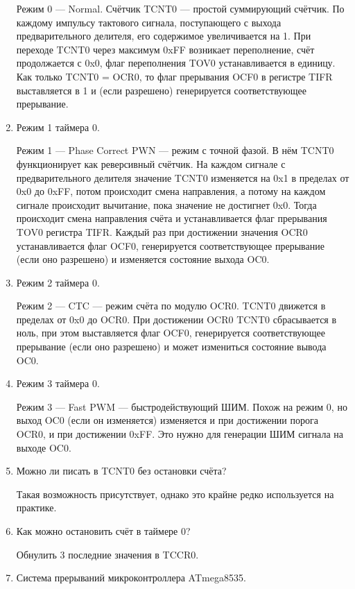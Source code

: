 \documentclass{lab}
\begin{document}
\begin{enumerate}
	Режим 0 — Normal. Счётчик TCNT0 — простой суммирующий счётчик. По каждому
	импульсу тактового сигнала, поступающего с выхода предварительного делителя, его
	содержимое увеличивается на 1. При переходе TCNT0 через максимум 0xFF возникает
	переполнение, счёт продолжается с 0x0, флаг переполнения TOV0 устанавливается в
	единицу. Как только TCNT0 = OCR0, то флаг прерывания OCF0 в регистре TIFR
	выставляется в 1 и (если разрешено) генерируется соответствующее прерывание.
	
	
	\item Режим 1 таймера 0.
	
	Режим 1 — Phase Correct PWN — режим с точной фазой. В нём TCNT0 функционирует
	как реверсивный счётчик. На каждом сигнале с предварительного делителя значение
	TCNT0 изменяется на 0x1 в пределах от 0x0 до 0xFF, потом происходит смена направления, а потому на каждом сигнале происходит вычитание, пока значение не достигнет 0x0.
	Тогда происходит смена направления счёта и устанавливается флаг прерывания TOV0
	регистра TIFR. Каждый раз при достижении значения OCR0 устанавливается флаг
	OCF0, генерируется соответствующее прерывание (если оно разрешено) и изменяется
	состояние выхода OC0.
	
	
	\item Режим 2 таймера 0.
	
	Режим 2 — CTC — режим счёта по модулю OCR0. TCNT0 движется в пределах от 0x0
	до OCR0. При достижении OCR0 TCNT0 сбрасывается в ноль, при этом выставляется
	флаг OCF0, генерируется соответствующее прерывание (если оно разрешено) и может
	измениться состояние вывода OC0.
	
	\item Режим 3 таймера 0.
	
	Режим 3 — Fast PWM — быстродействующий ШИМ. Похож на режим 0, но выход OC0
	(если он изменяется) изменяется и при достижении порога OCR0, и при достижении
	0xFF. Это нужно для генерации ШИМ сигнала на выходе OC0.
	
	
	\item Можно ли писать в TCNT0 без остановки счёта?
	
	Такая возможность присутствует, однако это крайне редко используется на практике.
	
	
	\item Как можно остановить счёт в таймере 0?
	
	Обнулить 3 последние значения в TCCR0.
	\item Система прерываний микроконтроллера ATmega8535.
	

\end{enumerate}
\end{document}
